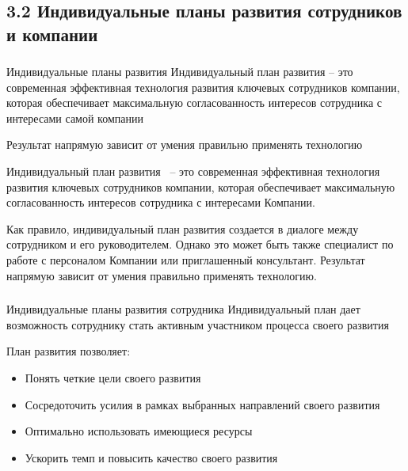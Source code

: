 \documentclass{../industrial-development}
\begin{document}
\subsection{3.2 Индивидуальные планы развития сотрудников и компании }


\begin{frame} \frametitle{}
  \begin{block}{Индивидуальные планы развития}
 \alert{Индивидуальный план развития} – это современная эффективная технология развития ключевых сотрудников компании, которая обеспечивает максимальную согласованность интересов сотрудника с интересами самой компании
  \end{block}
  
  \bigskip
Результат напрямую зависит от умения правильно применять технологию

\end{frame}

\lecturenotes

Индивидуальный план развития~\cite{IPl} – это современная эффективная технология развития ключевых сотрудников компании, которая обеспечивает максимальную согласованность интересов сотрудника с интересами Компании.

Как правило, индивидуальный план развития создается в диалоге между сотрудником и его руководителем. Однако это может быть также специалист по работе с персоналом Компании или приглашенный консультант. Результат напрямую зависит от умения правильно применять технологию.


\begin{frame} \frametitle{}
  \begin{block}{Индивидуальные планы развития сотрудника}
Индивидуальный план дает возможность сотруднику стать активным участником процесса своего развития
  \end{block}
   \bigskip 
План развития позволяет:
   \begin{itemize}
  \item Понять четкие цели своего развития
  \item Сосредоточить усилия в рамках выбранных направлений своего развития
  \item Оптимально использовать имеющиеся ресурсы
 \item Ускорить темп и повысить качество своего развития
  \end{itemize}
\end{frame}
\end{document}
